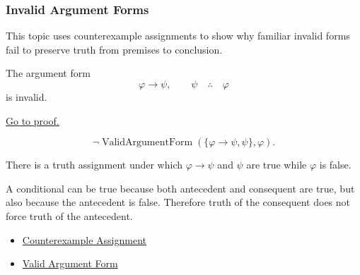 \subsubsection*{Invalid Argument Forms}

\begin{remark*}
This topic uses counterexample assignments to show why familiar invalid forms
fail to preserve truth from premises to conclusion.
\end{remark*}

\begin{tcolorbox}[colback=thmbox, colframe=thmborder, arc=2pt,
  left=6pt, right=6pt, top=4pt, bottom=4pt,
  title={\small\textbf{Theorem (Affirming the Consequent is Invalid)}},
  fonttitle=\small\bfseries]
\begin{theorem}
\label{thm:affirming-consequent-invalid-propositional-logic}
The argument form
\[
\varphi\to\psi,\qquad \psi \quad\therefore\quad \varphi
\]
is invalid.

\noindent\hyperref[prf:affirming-consequent-invalid-propositional-logic]{Go to proof.}
\end{theorem}
\end{tcolorbox}

\begin{remark*}
\[
\neg\operatorname{ValidArgumentForm}(\{\varphi\to\psi,\psi\},\varphi).
\]
\end{remark*}

\begin{remark*}
There is a truth assignment under which \(\varphi\to\psi\) and \(\psi\) are true
while \(\varphi\) is false.
\end{remark*}

\begin{remark*}[Interpretation]
A conditional can be true because both antecedent and consequent are true, but
also because the antecedent is false. Therefore truth of the consequent does not
force truth of the antecedent.
\end{remark*}

\begin{dependencies}
\begin{itemize}
  \item \hyperref[def:counterexample-assignment-propositional-logic]{Counterexample Assignment}
  \item \hyperref[def:valid-argument-form-propositional-logic]{Valid Argument Form}
\end{itemize}
\end{dependencies}

